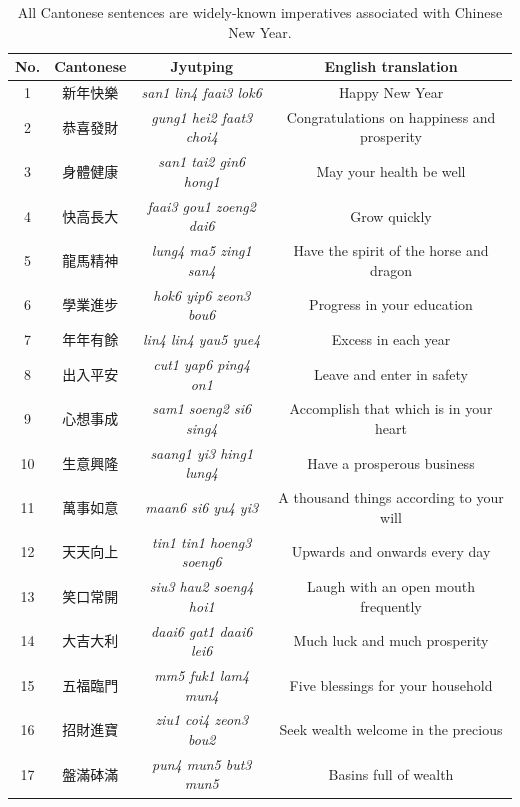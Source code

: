 \begin{table}[!htbp]
\begin{center}
  \footnotesize
\begin{tabular}{cccc} %
\toprule
\textbf{No.} & \textbf{Cantonese} & \textbf{Jyutping} & \textbf{English translation} \\ 
\midrule
1 & 新年快樂 & \textit{san1 lin4 faai3 lok6} & Happy New Year \\ 
2 & 恭喜發財 & \textit{gung1 hei2 faat3 choi4} & Congratulations on happiness and prosperity \\ 
3 & 身體健康 & \textit{san1 tai2 gin6 hong1} & May your health be well \\ 
4 & 快高長大 & \textit{faai3 gou1 zoeng2 dai6} & Grow quickly \\ 
5 & 龍馬精神 & \textit{lung4 ma5 zing1 san4} & Have the spirit of the horse and dragon \\ 
6 & 學業進步 &\textit{ hok6 yip6 zeon3 bou6} & Progress in your education \\ 
7 & 年年有餘 & \textit{lin4 lin4 yau5 yue4} & Excess in each year \\ 
8 & 出入平安 & \textit{cut1 yap6 ping4 on1} & Leave and enter in safety \\ 
9 & 心想事成 & \textit{sam1 soeng2 si6 sing4} & Accomplish that which is in your heart \\ 
10 & 生意興隆 & \textit{saang1 yi3 hing1 lung4} & Have a prosperous business \\ 
11 & 萬事如意 & \textit{maan6 si6 yu4 yi3} & A thousand things according to your will \\ 
12 & 天天向上 & \textit{tin1 tin1 hoeng3 soeng6} & Upwards and onwards every day \\ 
13 & 笑口常開 & \textit{siu3 hau2 soeng4 hoi1} & Laugh with an open mouth frequently \\ 
14 & 大吉大利 & \textit{daai6 gat1 daai6 lei6} & Much luck and much prosperity \\ 
15 & 五福臨門 & \textit{mm5 fuk1 lam4 mun4} & Five blessings for your household \\ 
16 & 招財進寶 & \textit{ziu1 coi4 zeon3 bou2} & Seek wealth welcome in the precious \\ 
17 & 盤滿砵滿 & \textit{pun4 mun5 but3 mun5} & Basins full of wealth \\ 
\bottomrule
\end{tabular}
\caption{All Cantonese sentences are widely-known imperatives associated with Chinese New Year.}
\label{ch2:tab:can_sent}
\end{center}
\end{table}

